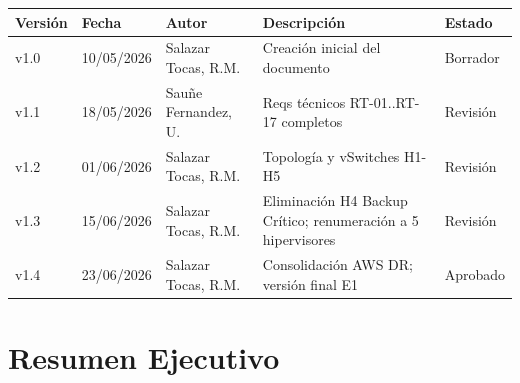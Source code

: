 \documentclass[11pt, a4paper, oneside]{report}
\begin{document}
{\centering

\begin{tabular}{@{}|C{1.5cm}|C{2.2cm}|L{3cm}|L{5cm}|C{2cm}|@{}}


  {\color{white}\bfseries\small Versión} &
  {\color{white}\bfseries\small Fecha} &
  {\color{white}\bfseries\small Autor} &
  {\color{white}\bfseries\small Descripción} &
  {\color{white}\bfseries\small Estado} \\  \hline

  \small v1.0 & \small 10/05/2026 & \small Salazar Tocas, R.M. & \small Creación inicial del documento & \small Borrador \\ \hline
  \small v1.1 & \small 18/05/2026 & \small Sauñe Fernandez, U.  & \small Reqs técnicos RT-01..RT-17 completos & \small Revisión \\ \hline
  \small v1.2 & \small 01/06/2026 & \small Salazar Tocas, R.M. & \small Topología y vSwitches H1-H5 & \small Revisión \\ \hline
  \small v1.3 & \small 15/06/2026 & \small Salazar Tocas, R.M. & \small Eliminación H4 Backup Crítico; renumeración a 5 hipervisores & \small Revisión \\ \hline
  \small v1.4 & \small 23/06/2026 & \small Salazar Tocas, R.M. & \small Consolidación AWS DR; versión final E1 & \small Aprobado \\ \hline

\end{tabular}
\par}

\newpage
\pagestyle{fancy}
\tableofcontents
\clearpage
{}


\newpage
\pagestyle{fancy} %

\chapter{Resumen Ejecutivo}
\end{document}
